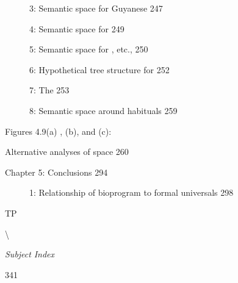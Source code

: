 \begin{figure}
\caption{3: Semantic space for Guyanese  247}
\label{fig:4}
\end{figure}

\begin{figure}
\caption{4: Semantic space for   249}
\label{fig:4}
\end{figure}

\begin{figure}
\caption{5: Semantic space for , etc.,  250}
\label{fig:4}
\end{figure}

\begin{figure}
\caption{6: Hypothetical tree structure for  252}
\label{fig:4}
\end{figure}

\begin{figure}
\caption{7: The  253}
\label{fig:4}
\end{figure}

\begin{figure}
\caption{8: Semantic space around habituals 259}
\label{fig:4}
\end{figure}

Figures 4.9(a) , (b), and (c):

Alternative analyses of  space 260

Chapter 5: Conclusions 294

\begin{figure}
\caption{1: Relationship of bioprogram to formal universals 298}
\label{fig:5}
\end{figure}

TP  

{\textbackslash}

\textit{Subject} \textit{Index}

341

